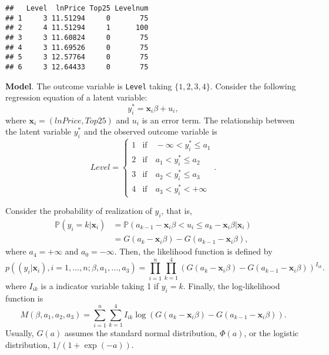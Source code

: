 \documentclass[
  12pt,
]{article}
\begin{document}
\begin{verbatim}
##   Level  lnPrice Top25 Levelnum
## 1     3 11.51294     0       75
## 2     4 11.51294     1      100
## 3     3 11.60824     0       75
## 4     3 11.69526     0       75
## 5     3 12.57764     0       75
## 6     3 12.64433     0       75
\end{verbatim}

\noindent \textbf{Model}. The outcome variable is \texttt{Level} taking
\(\{1, 2, 3, 4\}\). Consider the following regression equation of a
latent variable: \begin{equation*}
  y_i^* = \mathbf{x}_i \beta + u_i,
\end{equation*} where \(\mathbf{x}_i = (lnPrice, Top25)\) and \(u_i\) is
an error term. The relationship between the latent variable \(y_i^*\)
and the observed outcome variable is \begin{equation*}
  Level =
  \begin{cases}
    1 &\text{if}\quad -\infty < y_i^* \le a_1  \\
    2 &\text{if}\quad a_1 < y_i^* \le a_2 \\
    3 &\text{if}\quad a_2 < y_i^* \le a_3 \\
    4 &\text{if}\quad a_3 < y_i^* < +\infty
  \end{cases}.
\end{equation*}

Consider the probability of realization of \(y_i\), that is,
\begin{equation*}
  \begin{split}
  \mathbb{P}(y_i = k | \mathbf{x}_i) 
  &= \mathbb{P}(a_{k-1} - \mathbf{x}_i \beta < u_i \le a_k - \mathbf{x}_i \beta | \mathbf{x}_i)  \\
  &= G(a_k - \mathbf{x}_i \beta) - G(a_{k-1} - \mathbf{x}_i \beta),
  \end{split}
\end{equation*} where \(a_{4} = +\infty\) and \(a_0 = -\infty\). Then,
the likelihood function is defined by \begin{equation*}
  p((y_i|\mathbf{x}_i), i = 1, \ldots, n; \beta, a_1, \ldots, a_3)
  = \prod_{i=1}^n \prod_{k=1}^4 (G(a_k - \mathbf{x}_i \beta) - G(a_{k-1} - \mathbf{x}_i \beta))^{I_{ik}}.
\end{equation*} where \(I_{ik}\) is a indicator variable taking 1 if
\(y_i = k\). Finally, the log-likelihood function is \begin{equation*}
  M(\beta, a_1, a_2, a_3) = \sum_{i=1}^n \sum_{k=1}^4 I_{ik} \log(G(a_k - \mathbf{x}_i \beta) - G(a_{k-1} - \mathbf{x}_i \beta)).
\end{equation*} Usually, \(G(a)\) assumes the standard normal
distribution, \(\Phi(a)\), or the logistic distribution,
\(1/(1 + \exp(-a))\).
\end{document}

